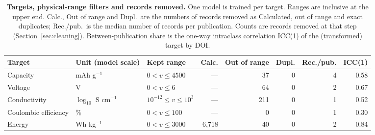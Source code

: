 \documentclass[3p]{elsarticle}
\begin{document}
\clearpage
\begin{table}[H]
    \centering\small
    \caption{\textbf{Targets, physical-range filters and records removed.} One model is trained per target. Ranges are inclusive at the upper end. Calc., Out of range and Dupl.\ are the numbers of records removed as Calculated, out of range and exact duplicates; Rec./pub.\ is the median number of records per publication. Counts are records removed at that step (Section~\ref{sec:cleaning}). Between-publication share is the one-way intraclass correlation ICC(1) of the (transformed) target by DOI.}
    \label{tab:targets}
    \setlength{\tabcolsep}{4pt}\footnotesize
    \begin{tabular}{@{}lllrrrrr@{}}
        \toprule
        Target & Unit (model scale) & Kept range & Calc. & Out of range & Dupl. & Rec./pub. & ICC(1) \\
        \midrule
        Capacity              & mAh g$^{-1}$ & $0 < v \le 4500$ & --- & 37 & 0 & 4 & 0.58 \\
        Voltage               & V & $0 < v \le 6$    & --- & 64 & 0 & 2 & 0.67 \\
        Conductivity          & $\log_{10}$ S cm$^{-1}$ & $10^{-12} \le v \le 10^{3}$ & --- & 211 & 0 & 1 & 0.52 \\
        Coulombic efficiency  & \% & $0 < v \le 100$  & --- & 0 & 0 & 1 & 0.30 \\
        Energy                & Wh kg$^{-1}$ & $0 < v \le 3000$ & 6,718 & 40 & 0 & 2 & 0.84 \\
        \bottomrule
    \end{tabular}
\end{table}
\end{document}
